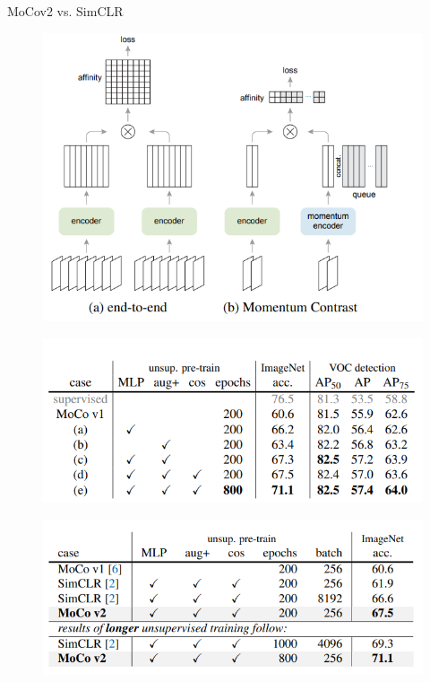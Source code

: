 \begin{frame}[allowframebreaks]{MoCov2 vs. SimCLR}
\begin{figure}
    \centering
    \includegraphics[width=\linewidth,height=0.9\textheight,keepaspectratio]{images/contrastive/slide_77_1_img.png}
\end{figure}

\framebreak

\begin{figure}
    \centering
    \includegraphics[width=\linewidth,height=0.9\textheight,keepaspectratio]{images/contrastive/slide_78_1_img.png}
\end{figure}

\framebreak

\begin{figure}
    \centering
    \includegraphics[width=\linewidth,height=0.9\textheight,keepaspectratio]{images/contrastive/slide_79_1_img.png}
\end{figure}

\end{frame}
